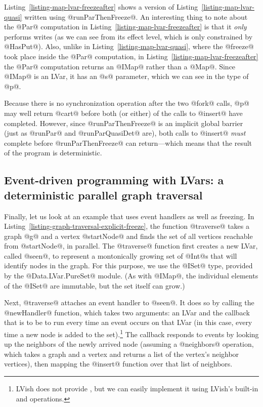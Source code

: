 Listing~\ref{listing-map-lvar-freezeafter} shows a version of
Listing~\ref{listing-map-lvar-quasi} written using @runParThenFreeze@.
An interesting thing to note about the @Par@ computation in
Listing~\ref{listing-map-lvar-freezeafter} is that it \emph{only}
performs writes (as we can see from its effect level, which is only
constrained by @HasPut@).  Also, unlike in
Listing~\ref{listing-map-lvar-quasi}, where the @freeze@ took place
inside the @Par@ computation, in
Listing~\ref{listing-map-lvar-freezeafter} the @Par@ computation
returns an @IMap@ rather than a @Map@.  Since @IMap@ is an LVar, it
has an @s@ parameter, which we can see in the type of @p@.

Because there is no synchronization operation after the two @fork@
calls, @p@ may well return @cart@ before both (or either) of the calls
to @insert@ have completed.  However, since @runParThenFreeze@ is an
implicit global barrier (just as @runPar@ and @runParQuasiDet@ are),
both calls to @insert@ \emph{must} complete before @runParThenFreeze@
can return---which means that the result of the program is
deterministic.

\subsection{Event-driven programming with LVars: a deterministic parallel graph traversal}\label{subsection:lvish-parallel-graph-traversal}

Finally, let us look at an example that uses event handlers as well as
freezing.  In Listing~\ref{listing-graph-traversal-explicit-freeze},
the function @traverse@ takes a graph @g@ and a vertex @startNode@ and
finds the set of all vertices reachable from @startNode@, in parallel.
The @traverse@ function first creates a new LVar, called @seen@, to
represent a montonically growing set of @Int@s that will identify
nodes in the graph.  For this purpose, we use the @ISet@ type,
provided by the @Data.LVar.PureSet@ module.  (As with @IMap@, the
individual elements of the @ISet@ are immutable, but the set itself
can grow.)

\singlespacing

\doublespacing

Next, @traverse@ attaches an event handler to @seen@.  It does so by
calling the @newHandler@ function, which takes two arguments: an LVar
and the callback that is to be to run every time an event occurs on
that LVar (in this case, every time a new node is added to the
set).\footnote{LVish does not provide , but we can
  easily implement it using LVish's built-in  and
   operations.}  The callback responds to events by
looking up the neighbors of the newly arrived node (assuming a
@neighbors@ operation, which takes a graph and a vertex and returns a
list of the vertex's neighbor vertices), then mapping the @insert@
function over that list of neighbors.

